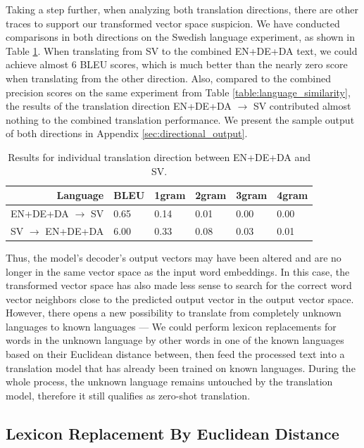 \documentclass[thesis,fonts=libertine]{cluu}
\begin{document}
Taking a step further, when analyzing both translation directions, there are other traces to support our transformed vector space suspicion. We have conducted comparisons in both directions on the Swedish language experiment, as shown in Table \ref{table:directional_results}. When translating from SV to the combined EN+DE+DA text, we could achieve almost 6 BLEU scores, which is much better than the nearly zero score when translating from the other direction. Also, compared to the combined precision scores on the same experiment from Table \ref{table:language_similarity}, the results of the translation direction EN+DE+DA $\rightarrow$ SV contributed almost nothing to the combined translation performance. We present the sample output of both directions in Appendix \ref{sec:directional_output}.

\begin{table}
  \centering
  \begin{tabular}{r|*{5}{l}}
    \hline
    \textbf{Language} & \textbf{BLEU} & \textbf{1gram} & \textbf{2gram} & \textbf{3gram} & \textbf{4gram} \\ [0.25ex]
    \hline\hline
    EN+DE+DA $\rightarrow$ SV & 0.65 & 0.14 & 0.01 & 0.00 & 0.00 \\
    SV $\rightarrow$ EN+DE+DA & 6.00 & 0.33 & 0.08 & 0.03 & 0.01 \\
    \hline
  \end{tabular}
  \caption{Results for individual translation direction between EN+DE+DA and SV.}
  \label{table:directional_results}
\end{table}

Thus, the model's decoder's output vectors may have been altered and are no longer in the same vector space as the input word embeddings. In this case, the transformed vector space has also made less sense to search for the correct word vector neighbors close to the predicted output vector in the output vector space. However, there opens a new possibility to translate from completely unknown languages to known languages --- We could perform lexicon replacements for words in the unknown language by other words in one of the known languages based on their Euclidean distance between, then feed the processed text into a translation model that has already been trained on known languages. During the whole process, the unknown language remains untouched by the translation model, therefore it still qualifies as zero-shot translation.

\subsection{Lexicon Replacement By Euclidean Distance}
\end{document}

